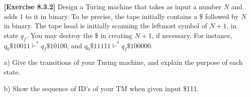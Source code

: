 \textbf{[Exercise 8.3.2]} Design a Turing machine that takes as input
a number $N$ and adds 1 to it in binary. To be precise, the tape initially
contains a \$ followed by $N$ in binary. The tape head is initially scanning 
the leftmost symbol of $N+1$, in state $q_f$. You may destroy the \$ in creating
$N+1$, if necessary. For instance, $q_0\$10011\vdash^*q_f\$10100$, and 
$q_0\$11111\vdash^*q_f\$100000$.

a) Give the transitions of your Turing machine, and explain the purpose of 
each state.

b) Show the sequence of ID's of your TM when given input \$111.
